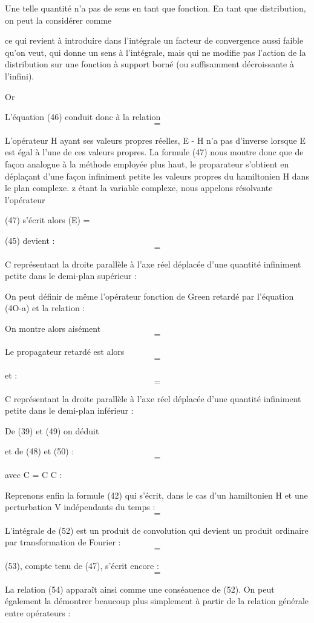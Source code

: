 Une telle quantité n'a pas de sens en tant que fonction. En tant que distribution, on peut la considérer comme

ce qui revient à introduire dans l'intégrale un facteur de convergence aussi
faible qu'on veut, qui donne un sens à l'intégrale, mais qui ne modifie pas
l'action de la distribution sur une fonction à support borné (ou suffisamment
décroissante à l'infini).

Or

L'équation (46) conduit donc à la relation
\[
\tag{47}=
\]

L'opérateur H ayant ses valeurs propres réelles, E - H n'a pas d'inverse
lorsque E est égal à l'une de ces valeurs propres. La formule (47) nous
montre donc que de façon analogue à la méthode employée plus haut, le
proparateur s'obtient en déplaçant d'une façon infiniment petite les valeurs
propres du hamiltonien H dans le plan complexe. z étant la variable complexe,
nous appelons résolvante l'opérateur

(47) s'écrit alors (E) = 

(45) devient :
\[
\tag{48}=
\]

C représentant la droite parallèle à l'axe réel déplacée d'une quantité
infiniment petite dans le demi-plan supérieur :

On peut définir de même l'opérateur fonction de Green retardé  par
l'équation (4O-a) et la relation :

On montre alors aisément
\[
\tag{49}=
\]

Le propagateur retardé est alors
\[
=
\]

et :
\[
\tag{50}=
\]

C représentant la droite parallèle à l'axe réel déplacée d'une quantité
infiniment petite dans le demi-plan inférieur :

De (39) et (49) on déduit

et de (48) et (50) :
\[
\tag{51}=
\]

avec C = C  C :

Reprenons enfin la formule (42) qui s'écrit, dans le cas d'un
hamiltonien H et une perturbation V indépendants du temps :
\[
\tag{52}=
\]

L'intégrale de (52) est un produit de convolution qui devient un produit
ordinaire par transformation de Fourier :
\[
\tag{53}=
\]

(53), compte tenu de (47), s'écrit encore :
\[
\tag{54}=
\]

La relation (54) apparaît ainsi comme une conséauence de (52). On peut
également la démontrer beaucoup plus simplement à partir de la relation
générale entre opérateurs :
